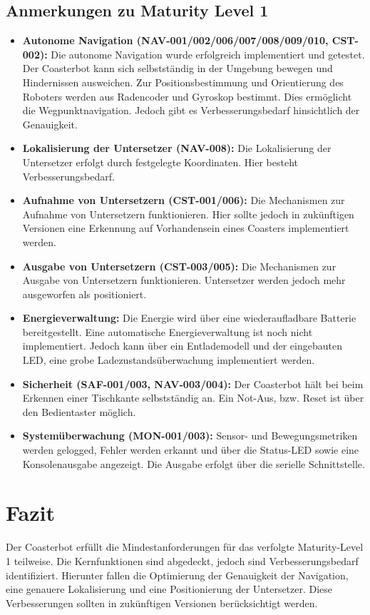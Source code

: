 \documentclass[
  a4paper,
  12pt,
  DIV=12,        %
  parskip=half,  %
  headings=small %
]{scrartcl}
\theoremstyle{definition}
\theoremstyle{definition}
\begin{document}
\subsection{Anmerkungen zu Maturity Level 1}\label{anmerkungen}
\begin{itemize}
\item \textbf{Autonome Navigation (NAV-001/002/006/007/008/009/010, CST-002):} Die autonome Navigation wurde erfolgreich implementiert und getestet. Der Coasterbot kann sich selbstständig in der Umgebung bewegen und Hindernissen ausweichen. Zur Positionsbestimmung und Orientierung des Roboters werden aus Radencoder und Gyroskop bestimmt. Dies ermöglicht die Wegpunktnavigation. Jedoch gibt es Verbesserungsbedarf hinsichtlich der Genauigkeit.
\item \textbf{Lokalisierung der Untersetzer (NAV-008):} Die Lokalisierung der Untersetzer erfolgt durch festgelegte Koordinaten. Hier besteht Verbesserungsbedarf.
\item \textbf{Aufnahme von Untersetzern (CST-001/006):} Die Mechanismen zur Aufnahme von Untersetzern funktionieren. Hier sollte jedoch in zukünftigen Versionen eine Erkennung auf Vorhandensein eines Coasters implementiert werden.
\item \textbf{Ausgabe von Untersetzern (CST-003/005):} Die Mechanismen zur Ausgabe von Untersetzern funktionieren. Untersetzer werden jedoch mehr ausgeworfen als positioniert.
\item \textbf{Energieverwaltung:} Die Energie wird über eine wiederaufladbare Batterie bereitgestellt. Eine automatische Energieverwaltung ist noch nicht implementiert. Jedoch kann über ein Entlademodell und der eingebauten LED, eine grobe Ladezustandsüberwachung implementiert werden.
\item \textbf{Sicherheit (SAF-001/003, NAV-003/004):} Der Coasterbot hält bei beim Erkennen einer Tischkante selbstständig an. Ein Not-Aus, bzw. Reset ist über den Bedientaster möglich.
\item \textbf{Systemüberwachung (MON-001/003):} Sensor- und Bewegungsmetriken werden gelogged, Fehler werden erkannt und über die Status-LED sowie eine Konsolenausgabe angezeigt. Die Ausgabe erfolgt über die serielle Schnittstelle.
\end{itemize}

\newpage
\section{Fazit}\label{fazit}
Der Coasterbot erfüllt die Mindestanforderungen für das verfolgte Maturity-Level 1 teilweise.
Die Kernfunktionen sind abgedeckt, jedoch sind Verbesserungsbedarf identifiziert. Hierunter fallen die Optimierung der Genauigkeit der Navigation, eine genauere Lokalisierung und eine Positionierung der Untersetzer.
Diese Verbesserungen sollten in zukünftigen Versionen berücksichtigt werden.
\end{document}
